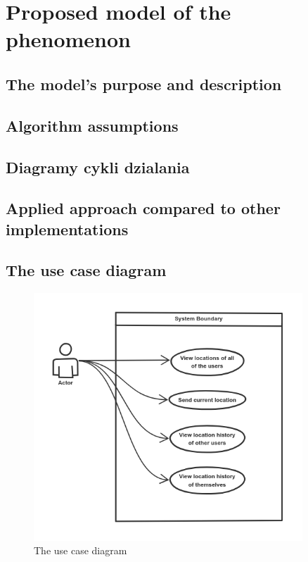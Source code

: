 \chapter{Proposed model of the phenomenon} \label{ch:model}

\section{The model's purpose and description}
\blindtext[2]

\section{Algorithm assumptions}
\blindtext[2]

\section{Diagramy cykli dzialania}
\blindtext[2]

\section{Applied approach compared to other implementations}
\blindtext[2]

\section{The use case diagram}

\begin{figure}[H]
    \includegraphics[width=0.9\textwidth]{images/diagram.png}
    \caption{The use case diagram}
\end{figure}
